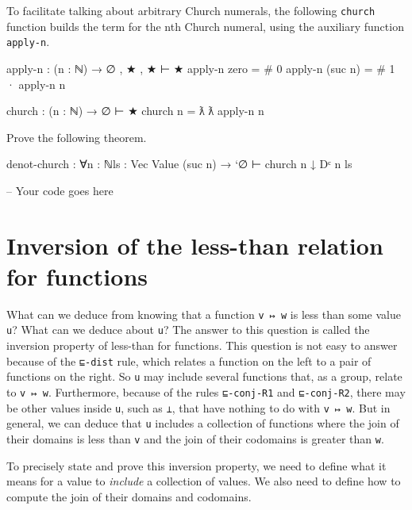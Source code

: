 To facilitate talking about arbitrary Church numerals, the following
\texttt{church} function builds the term for the nth Church numeral,
using the auxiliary function \texttt{apply-n}.

\begin{fence}
\begin{code}
apply-n : (n : ℕ) → ∅ , ★ , ★ ⊢ ★
apply-n zero = # 0
apply-n (suc n) = # 1 · apply-n n

church : (n : ℕ) → ∅ ⊢ ★
church n = ƛ ƛ apply-n n
\end{code}
\end{fence}

Prove the following theorem.

\begin{myDisplay}
denot-church : ∀{n : ℕ}{ls : Vec Value (suc n)}
   → `∅ ⊢ church n ↓ Dᶜ n ls
\end{myDisplay}

\begin{fence}
\begin{code}
-- Your code goes here
\end{code}
\end{fence}

\hypertarget{inversion-of-the-less-than-relation-for-functions}{%
\section{Inversion of the less-than relation for
functions}\label{inversion-of-the-less-than-relation-for-functions}}

What can we deduce from knowing that a function \texttt{v\ ↦\ w} is less
than some value \texttt{u}? What can we deduce about \texttt{u}? The
answer to this question is called the inversion property of less-than
for functions. This question is not easy to answer because of the
\texttt{⊑-dist} rule, which relates a function on the left to a pair of
functions on the right. So \texttt{u} may include several functions
that, as a group, relate to \texttt{v\ ↦\ w}. Furthermore, because of
the rules \texttt{⊑-conj-R1} and \texttt{⊑-conj-R2}, there may be other
values inside \texttt{u}, such as \texttt{⊥}, that have nothing to do
with \texttt{v\ ↦\ w}. But in general, we can deduce that \texttt{u}
includes a collection of functions where the join of their domains is
less than \texttt{v} and the join of their codomains is greater than
\texttt{w}.

To precisely state and prove this inversion property, we need to define
what it means for a value to \emph{include} a collection of values. We
also need to define how to compute the join of their domains and
codomains.

